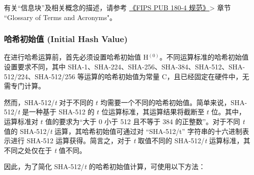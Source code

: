 \documentclass[main\_\_CN.tex]{subfiles}
\begin{document}
\begin{tiplisting}
有关“信息块”及相关概念的描述，请参考 \href{https://doi.org/10.6028/NIST.FIPS.180-4}{《FIPS PUB 180-4 规范》}> 章节 ``Glossary of Terms and Acronyms"。
\end{tiplisting}

\subsubsection{哈希初始值 (Initial Hash Value)}\label{sec:sha-initialhash}

在进行哈希运算前，首先必须设置哈希初始值 H$^{(0)}$。不同运算标准的哈希初始值设置要求不同，其中 SHA-1、SHA-224、SHA-256、SHA-384、SHA-512、SHA-512/224、SHA-512/256 等运算的哈希初始值为常量 C，且已经固定在硬件中，无需专门计算。

然而，SHA-512/{\it{t}} 对于不同的 \begin{math}t\end{math} 均需要一个不同的哈希初始值。简单来说，SHA-512/{\it{t}} 是一种基于 SHA-512 的 \begin{math}t\end{math} 位运算标准，其运算结果将截断至 \begin{math}t\end{math} 位。其中，运算标准对 \begin{math}t\end{math} 值的要求为“大于 0 小于 512 且不等于 384 的正整数”。对于不同 {\it{t}} 值的 SHA-512/{\it{t}} 运算，其哈希初始值可通过对 ``SHA-512/t” 字符串的十六进制表示进行 SHA-512 运算获得。简言之，对于 {\it{t}} 取值不同的 SHA-512/{\it{t}} 运算标准，其不同之处仅在于 {\it{t}} 值不同。

因此，为了简化 SHA-512/{\it{t}} 的哈希初始值计算，可使用以下方法：
\end{document}
